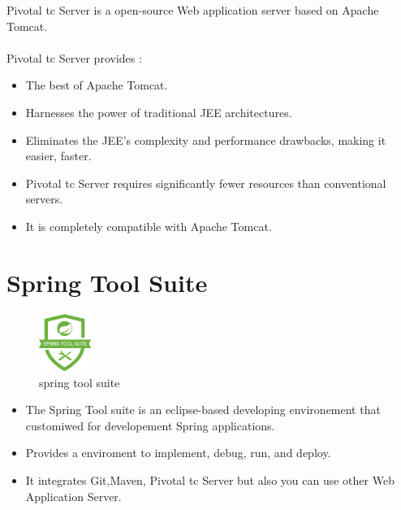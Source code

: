 Pivotal tc Server is a open-source Web application server based on Apache Tomcat.
\\
\\
Pivotal tc Server provides :
\begin{itemize}
	\item The best of Apache Tomcat.
	\item Harnesses the power of traditional JEE architectures.
	\item Eliminates the JEE's complexity and performance drawbacks, making it easier, faster.
	\item Pivotal tc Server requires significantly fewer resources than conventional servers.
	\item It is completely compatible with Apache Tomcat.
\end{itemize}

\clearpage
\newpage

\section{Spring Tool Suite}

\begin{figure}[h]
	
	\centering
	\includegraphics[width=0.15\textwidth]{spring-tool-suite-project-logo.png}
	\caption{spring tool suite}
	\label{spring tool suite}
\end{figure}
\begin{itemize}
	\item The Spring Tool suite is an eclipse-based developing environement that customiwed for developement  Spring applications.
	\item Provides a enviroment to implement, debug, run, and deploy.
	\item It integrates Git,Maven, Pivotal tc Server but also you can use other Web Application Server. 
\end{itemize}

\clearpage
\newpage

